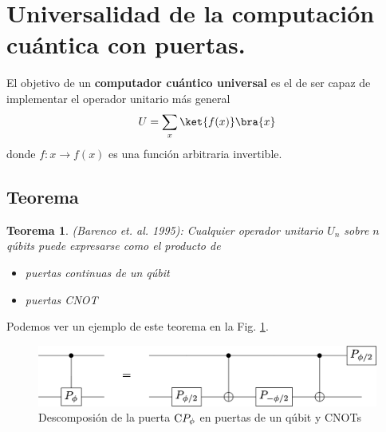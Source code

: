 \documentclass[a4paper,11pt]{book} %
\newtheorem{teorema_contador}{Teorema}
\newcommand{\Teorema}[1]{
		\begin{mybox_gray2}{}
			\begin{teorema_contador}
				 #1 
			\end{teorema_contador} 
		\end{mybox_gray2}
	}
\numberwithin{equation}{chapter}
\newcommand{\cg}[1]{{\rm C}#1}
\begin{document}
	\section{Universalidad de la computación cuántica con puertas.} \label{sec_elementos_universalidad}

El objetivo de un \textbf{computador cuántico universal} es el de ser capaz de implementar el operador unitario más general
	$$
	U  = \sum_x \ket{f(x)}\bra{x}
	$$
donde $f: x \to f(x)$ es una función arbitraria invertible.

    	\subsection{Teorema}



	\Teorema{ \textit{(Barenco et. al. 1995):} Cualquier operador unitario $U_n$ sobre $n$ qúbits puede expresarse como el 
	producto de 
	\begin{itemize}
		\item puertas continuas de \textit{un qúbit}
		\item puertas CNOT
	\end{itemize}
	}

Podemos ver un ejemplo de este teorema en la Fig. \ref{Fig_elementos_Equiv_Phase}.
	\begin{figure}[H]
	\centering 
	\includegraphics[width=0.60\linewidth]{Figuras/Fig_elementos_Equiv_Phase}
	\caption{Descomposión de la puerta $\cg{P_\phi}$ en puertas de un qúbit y CNOTs}
	\label{Fig_elementos_Equiv_Phase}
	\end{figure}
\end{document}
